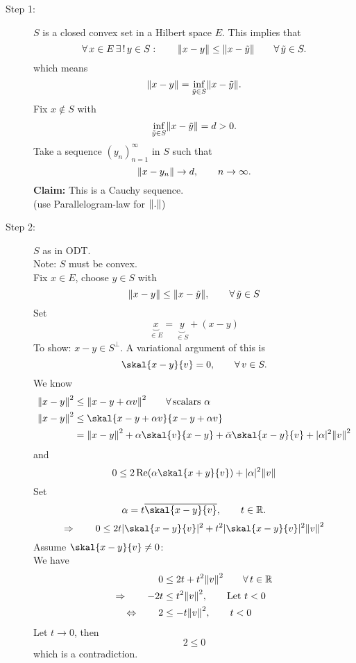 \begin{beweis}
	\begin{description}
		\item[Step 1:] $S$ is a closed convex set in a Hilbert space $E$. This implies that 
		\[
			\forall\,  x \in E \, \exists\,! \,y \in S: \qquad \norm{x-y} \leq \norm{x- \tilde y} \qquad \forall\, \tilde y \in S.
		\] 
		which means
		\[
			\norm{x-y} = \inf_{\tilde y \in S}\norm{x-\tilde y}.
		\]
		Fix $x \not \in S$ with
		\[
			\inf_{ \tilde y \in S} \norm{x- \tilde y} = d > 0.
		\]
		Take a sequence $(y_n)_{n=1}^{\infty}$ in $S$ such that 
		\[
			\norm{x-y_n} \to d, \qquad n \to \infty.
		\]
		\textbf{Claim:} \text{    } This is a Cauchy sequence. \\
		(use Parallelogram-law for $\norm{.}$)
		\item[Step 2:] $S$ as in ODT. \\
		Note: $S$ must be convex. \\
		Fix $x \in E$, choose $y \in S$ with
		\[
			\norm{x-y} \leq  \norm{x- \tilde y}, \qquad \forall\,  \tilde y \in S
		\]
		Set
		\[
			\underset{\in E}{\underbrace{x}} = \underset{\in S}{\underbrace{y}} + (x-y)
		\]
		To show: $x-y \in S^{\perp}$. A variational argument of this is 
		\[
			\skal{x-y}{v}= 0, \qquad \forall\, v \in S.
		\]
		We know
		\begin{align*}
			\norm{x-y}^2 &\leq \norm{x-y + \alpha v}^2 \qquad \forall\, \text{scalars }\alpha \\
			\norm{x-y}^2 &\leq \skal{x-y+\alpha v}{x-y+ \alpha v} \\
			&= \norm{x-y}^2+ \alpha \skal{v}{x-y} + \bar{\alpha} \skal{x-y}{v} + \abs{\alpha}^2 \norm{v}^2
		\end{align*}
		and
		\[
			0 \leq 2 \re( \alpha \skal{x+y}{v}) + \abs{\alpha}^2 \norm{v}
		\]
		Set 
		\[
			\alpha = t \overline{\skal{x-y}{v}}, \qquad t \in \mathbb{R}.
		\]
		\[
			\Rightarrow \qquad 0 \leq  2 t \abs{\skal{x-y}{v}}^2 + t^2 \abs{\skal{x-y}{v}}^2 \norm{v}^2
		\]
		Assume $\skal{x-y}{v} \neq 0$: \\
		We have 
		\begin{align*}
			0 &\leq 2t + t^2 \norm{v}^2 \qquad \forall\, t \in \mathbb{R} \\
			\Rightarrow \qquad -2t &\leq  t^2 \norm{v}^2, \qquad \text{Let }t <0 \\
			\Leftrightarrow \qquad 2 &\leq -t \norm{v}^2, \qquad t<0
		\end{align*}
		Let $t \to 0$, then
		\[
			2 \leq 0
		\]
		which is a contradiction.
	\end{description}
\end{beweis}